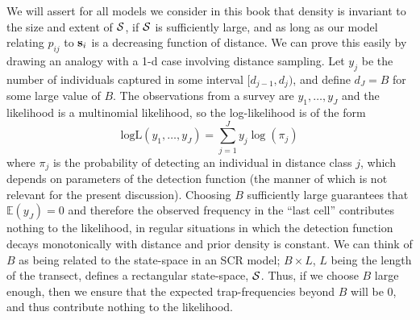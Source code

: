 We will assert for all models we consider in this book that density is
invariant to the size and extent of ${\cal S}$, if ${\cal S}$ is
sufficiently large, and as long as our model relating $p_{ij}$ to
${\bf s}_{i}$ is a decreasing function of distance.  We can prove this
easily by drawing an analogy with a 1-d case involving distance
sampling.  Let $y_{j}$ be the number of individuals captured in some
interval $[d_{j-1},d_{j})$, and define $d_{J} = B$ for some large
value of $B$.
 The observations from a survey are $y_{1},\ldots,y_J$
and the likelihood is a multinomial likelihood, so the log-likelihood
is of the form
\[
\mbox{logL}(y_{1},\ldots,y_{J}) = \sum_{j=1}^{J} y_{j} \log( \pi_{j} )
\]
where $\pi_{j}$ is the probability of detecting an individual in
distance class $j$, which depends on parameters of the detection
function (the manner of which is not relevant for the present
discussion).  Choosing $B$ sufficiently large guarantees that $\mathbb{E}(y_{J})
= 0$ and therefore the observed frequency in the ``last cell''
contributes nothing to the likelihood, in regular situations in which
the detection function decays monotonically with distance and prior
density is constant.
We can think of $B$ as being related to the state-space
in an SCR model; $B \times L$, $L$ being the length of the transect, defines
a rectangular state-space, ${\cal S}$. Thus, if we choose $B$ large enough, then
we ensure that the expected trap-frequencies beyond $B$ will be 0, and
thus contribute nothing to the likelihood.

